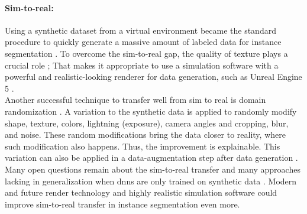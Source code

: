 		\paragraph{Sim-to-real:} Using a synthetic dataset from a virtual environment became the standard procedure to quickly generate a massive amount of labeled data for instance segmentation \cite{Danielczuk2019}\cite{Xie2020}\cite{Xie2021}\cite{Shao2018}\cite{Toda2019}. To overcome the sim-to-real gap, the quality of texture plays a crucial role \cite{Tabak2023}\cite{Martinez2019}; That makes it appropriate to use a simulation software with a powerful and realistic-looking renderer for data generation, such as Unreal Engine 5 \cite{Romero2022}.\\
		Another successful technique to transfer well from sim to real is domain randomization \cite{Raj2023}. A variation to the synthetic data is applied to randomly modify shape, texture, colors, lightning (exposure), camera angles and cropping, blur, and noise. These random modifications bring the data closer to reality, where such modification also happens. Thus, the improvement is explainable. This variation can also be applied in a data-augmentation step after data generation \cite{Kar2022}.\\
		Many open questions remain about the sim-to-real transfer and many approaches lacking in generalization when \ac{dnn}s are only trained on synthetic data \cite{Doersch2019}. Modern and future render technology and highly realistic simulation software could improve sim-to-real transfer in instance segmentation even more.
		\clearpage
